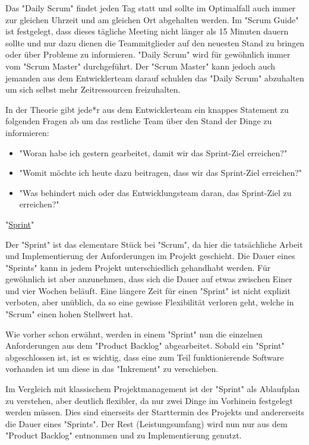 Das "Daily Scrum" findet jeden Tag statt und sollte im Optimalfall auch immer  zur gleichen Uhrzeit und am gleichen Ort abgehalten werden. Im "Scrum Guide" ist festgelegt, dass dieses tägliche Meeting nicht länger als 15 Minuten dauern sollte und nur dazu dienen die Teammitglieder auf den neuesten Stand zu bringen oder über Probleme zu informieren. "Daily Scrum" wird für gewöhnlich immer vom "Scrum Master" durchgeführt. Der "Scrum Master" kann jedoch auch jemanden aus dem Entwicklerteam darauf schulden das "Daily Scrum" abzuhalten um sich selbst mehr Zeitressourcen freizuhalten. \cite{DailyScrum}

In der Theorie gibt jede*r aus dem Entwicklerteam ein knappes Statement zu folgenden Fragen ab um das restliche Team über den Stand der Dinge zu informieren:

\begin{itemize}
    \item "Woran habe ich gestern gearbeitet, damit wir das Sprint-Ziel erreichen?" \cite{DailyScrum}
    \item "Womit möchte ich heute dazu beitragen, dass wir das Sprint-Ziel erreichen?" \cite{DailyScrum}
    \item "Was behindert mich oder das Entwicklungsteam daran, das Sprint-Ziel zu erreichen?" \cite{DailyScrum}
\end{itemize}

"\underline{Sprint}"

Der "Sprint" ist das elementare Stück bei "Scrum", da hier die tatsächliche Arbeit und Implementierung der Anforderungen im Projekt geschieht. Die Dauer eines "Sprints" kann in jedem Projekt unterschiedlich gehandhabt werden. Für gewöhnlich ist aber anzunehmen, dass sich die Dauer auf etwas zwischen Einer und vier Wochen beläuft. Eine längere Zeit für einen "Sprint" ist nicht explizit verboten, aber unüblich, da so eine gewisse Flexibilität verloren geht, welche in "Scrum" einen hohen Stellwert hat. \cite{Sprint}

Wie vorher schon erwähnt, werden in einem "Sprint" nun die einzelnen Anforderungen aus dem "Product Backlog" abgearbeitet. Sobald ein "Sprint" abgeschlossen ist, ist es wichtig, dass eine zum Teil funktionierende Software vorhanden ist um diese in das "Inkrement" zu verschieben. \cite{Sprint}

Im Vergleich mit klassischem Projektmanagement ist der "Sprint" als Ablaufplan zu verstehen, aber deutlich flexibler, da nur zwei Dinge im Vorhinein festgelegt werden müssen. Dies sind einerseits der Starttermin des Projekts und andererseits die Dauer eines "Sprints". Der Rest (Leistungsumfang) wird nun nur aus dem "Product Backlog" entnommen und zu Implementierung genutzt. \cite{Sprint}

